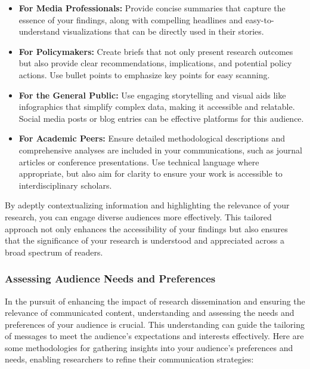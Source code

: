 \documentclass[
]{book}
\providecommand{\tightlist}{%
  \setlength{\itemsep}{0pt}\setlength{\parskip}{0pt}}
\begin{document}
\begin{itemize}
\tightlist
\item
  \textbf{For Media Professionals:} Provide concise summaries that capture the essence of your findings, along with compelling headlines and easy-to-understand visualizations that can be directly used in their stories.
\item
  \textbf{For Policymakers:} Create briefs that not only present research outcomes but also provide clear recommendations, implications, and potential policy actions. Use bullet points to emphasize key points for easy scanning.
\item
  \textbf{For the General Public:} Use engaging storytelling and visual aids like infographics that simplify complex data, making it accessible and relatable. Social media posts or blog entries can be effective platforms for this audience.
\item
  \textbf{For Academic Peers:} Ensure detailed methodological descriptions and comprehensive analyses are included in your communications, such as journal articles or conference presentations. Use technical language where appropriate, but also aim for clarity to ensure your work is accessible to interdisciplinary scholars.
\end{itemize}

By adeptly contextualizing information and highlighting the relevance of your research, you can engage diverse audiences more effectively. This tailored approach not only enhances the accessibility of your findings but also ensures that the significance of your research is understood and appreciated across a broad spectrum of readers.

\hypertarget{assessing-audience-needs-and-preferences-1}{%
\subsubsection*{Assessing Audience Needs and Preferences}\label{assessing-audience-needs-and-preferences-1}}

In the pursuit of enhancing the impact of research dissemination and ensuring the relevance of communicated content, understanding and assessing the needs and preferences of your audience is crucial. This understanding can guide the tailoring of messages to meet the audience's expectations and interests effectively. Here are some methodologies for gathering insights into your audience's preferences and needs, enabling researchers to refine their communication strategies:
\end{document}
